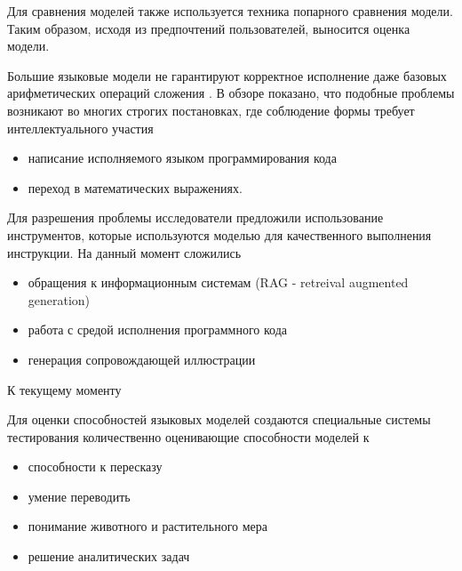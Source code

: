 Для сравнения моделей также используется техника попарного сравнения модели. 
Таким образом, исходя из предпочтений пользователей, выносится оценка модели.

Большие языковые модели не гарантируют корректное исполнение даже базовых арифметических операций сложения . 
В обзоре \cite{zhao2023survey} показано, что подобные проблемы возникают во многих строгих постановках, где
соблюдение формы требует интеллектуального участия \begin{itemize}
    \item написание исполняемого языком программирования кода
    \item переход в математических выражениях.
\end{itemize} 

Для разрешения проблемы исследователи предложили использование инструментов,
которые используются моделью для качественного выполнения инструкции. На данный момент сложились \begin{itemize}
    \item обращения к информационным системам  (RAG - retreival augmented generation)\cite{lewis2020retrieval}
    \item работа с средой исполнения программного кода \cite{parisi2022talm}
    \item генерация сопровождающей иллюстрации
\end{itemize}

К текущему моменту 

Для оценки способностей языковых моделей создаются специальные системы тестирования количественно оценивающие способности моделей к \begin{itemize}
    \item способности к пересказу
    \item умение переводить
    \item понимание животного и растительного мера 
    \item решение аналитических задач 
\end{itemize}








